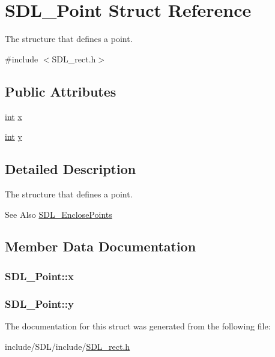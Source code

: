 \hypertarget{struct_s_d_l___point}{\section{S\-D\-L\-\_\-\-Point Struct Reference}
\label{struct_s_d_l___point}
}


The structure that defines a point.  




{\ttfamily \#include $<$S\-D\-L\-\_\-rect.\-h$>$}

\subsection*{Public Attributes}
\begin{DoxyCompactItemize}
\item 
\hyperlink{_s_d_l__thread_8h_a6a64f9be4433e4de6e2f2f548cf3c08e}{int} \hyperlink{struct_s_d_l___point_a2ee987d59888024771c8d83aec43056c}{x}
\item 
\hyperlink{_s_d_l__thread_8h_a6a64f9be4433e4de6e2f2f548cf3c08e}{int} \hyperlink{struct_s_d_l___point_aaa68aefa869f6bdf46367a70bd9414b0}{y}
\end{DoxyCompactItemize}


\subsection{Detailed Description}
The structure that defines a point. 

\begin{DoxySeeAlso}{See Also}
\hyperlink{_s_d_l__rect_8h_afcbb58dbba760b9e6fdb4b5d1ece015c}{S\-D\-L\-\_\-\-Enclose\-Points} 
\end{DoxySeeAlso}


\subsection{Member Data Documentation}
\hypertarget{struct_s_d_l___point_a2ee987d59888024771c8d83aec43056c}{
\subsubsection[{x}]{ S\-D\-L\-\_\-\-Point\-::x}}\label{struct_s_d_l___point_a2ee987d59888024771c8d83aec43056c}
\hypertarget{struct_s_d_l___point_aaa68aefa869f6bdf46367a70bd9414b0}{
\subsubsection[{y}]{ S\-D\-L\-\_\-\-Point\-::y}}\label{struct_s_d_l___point_aaa68aefa869f6bdf46367a70bd9414b0}


The documentation for this struct was generated from the following file\-:\begin{DoxyCompactItemize}
\item 
include/\-S\-D\-L/include/\hyperlink{_s_d_l__rect_8h}{S\-D\-L\-\_\-rect.\-h}\end{DoxyCompactItemize}
